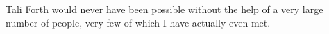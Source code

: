 Tali Forth would never have been possible without the help of a very large
number of people, very few of which I have actually even met.

